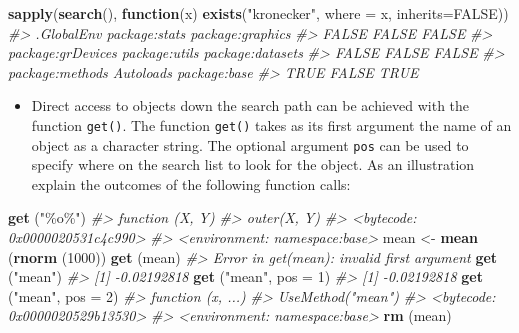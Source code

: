 \documentclass[
]{book}
\newenvironment{Shaded}{\begin{snugshade}}{\end{snugshade}}
\newcommand{\AttributeTok}[1]{\textcolor[rgb]{0.13,0.29,0.53}{#1}}
\newcommand{\CommentTok}[1]{\textcolor[rgb]{0.56,0.35,0.01}{\textit{#1}}}
\newcommand{\ConstantTok}[1]{\textcolor[rgb]{0.56,0.35,0.01}{#1}}
\newcommand{\ControlFlowTok}[1]{\textcolor[rgb]{0.13,0.29,0.53}{\textbf{#1}}}
\newcommand{\DecValTok}[1]{\textcolor[rgb]{0.00,0.00,0.81}{#1}}
\newcommand{\FunctionTok}[1]{\textcolor[rgb]{0.13,0.29,0.53}{\textbf{#1}}}
\newcommand{\NormalTok}[1]{#1}
\newcommand{\OtherTok}[1]{\textcolor[rgb]{0.56,0.35,0.01}{#1}}
\newcommand{\StringTok}[1]{\textcolor[rgb]{0.31,0.60,0.02}{#1}}
\providecommand{\tightlist}{%
  \setlength{\itemsep}{0pt}\setlength{\parskip}{0pt}}
\begin{document}
\begin{Shaded}
\begin{Highlighting}[]
\FunctionTok{sapply}\NormalTok{(}\FunctionTok{search}\NormalTok{(), }\ControlFlowTok{function}\NormalTok{(x) }\FunctionTok{exists}\NormalTok{(}\StringTok{"kronecker"}\NormalTok{, }\AttributeTok{where =}\NormalTok{ x, }\AttributeTok{inherits=}\ConstantTok{FALSE}\NormalTok{))}
\CommentTok{\#\textgreater{}        .GlobalEnv     package:stats  package:graphics }
\CommentTok{\#\textgreater{}             FALSE             FALSE             FALSE }
\CommentTok{\#\textgreater{} package:grDevices     package:utils  package:datasets }
\CommentTok{\#\textgreater{}             FALSE             FALSE             FALSE }
\CommentTok{\#\textgreater{}   package:methods         Autoloads      package:base }
\CommentTok{\#\textgreater{}              TRUE             FALSE              TRUE}
\end{Highlighting}
\end{Shaded}

\begin{itemize}
\tightlist
\item
  Direct access to objects down the search path can be achieved with the function \texttt{get()}.
  The function \texttt{get()} takes as its first argument the name of an object as a character string. The optional argument \texttt{pos} can be used to specify where on the search list to look for the object. As an illustration explain the outcomes of the following function calls:
\end{itemize}

\begin{Shaded}
\begin{Highlighting}[]
\FunctionTok{get}\NormalTok{ (}\StringTok{"\%o\%"}\NormalTok{) }
\CommentTok{\#\textgreater{} function (X, Y) }
\CommentTok{\#\textgreater{} outer(X, Y)}
\CommentTok{\#\textgreater{} \textless{}bytecode: 0x0000020531c4c990\textgreater{}}
\CommentTok{\#\textgreater{} \textless{}environment: namespace:base\textgreater{}}
\NormalTok{mean }\OtherTok{\textless{}{-}} \FunctionTok{mean}\NormalTok{ (}\FunctionTok{rnorm}\NormalTok{ (}\DecValTok{1000}\NormalTok{))}
\FunctionTok{get}\NormalTok{ (mean)}
\CommentTok{\#\textgreater{} Error in get(mean): invalid first argument}
\FunctionTok{get}\NormalTok{ (}\StringTok{"mean"}\NormalTok{) }
\CommentTok{\#\textgreater{} [1] {-}0.02192818}
\FunctionTok{get}\NormalTok{ (}\StringTok{"mean"}\NormalTok{, }\AttributeTok{pos =} \DecValTok{1}\NormalTok{) }
\CommentTok{\#\textgreater{} [1] {-}0.02192818}
\FunctionTok{get}\NormalTok{ (}\StringTok{"mean"}\NormalTok{, }\AttributeTok{pos =} \DecValTok{2}\NormalTok{)}
\CommentTok{\#\textgreater{} function (x, ...) }
\CommentTok{\#\textgreater{} UseMethod("mean")}
\CommentTok{\#\textgreater{} \textless{}bytecode: 0x0000020529b13530\textgreater{}}
\CommentTok{\#\textgreater{} \textless{}environment: namespace:base\textgreater{}}
\FunctionTok{rm}\NormalTok{ (mean)}
\end{Highlighting}
\end{Shaded}
\end{document}
